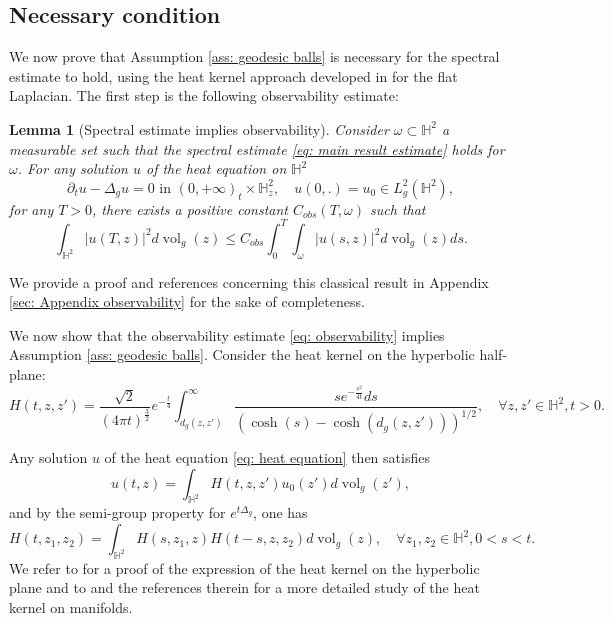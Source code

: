 \documentclass[letterpaper,11pt]{amsart}
\theoremstyle{note}
\newtheorem{lemma}[proposition]{Lemma}
\numberwithin{equation}{section}
\DeclareMathOperator{\vol}{vol}
\begin{document}
\subsection{Necessary condition}
\label{sec: necessary condition}

We now prove that Assumption \ref{ass: geodesic balls} is necessary for the spectral estimate to hold, using the heat kernel approach developed in \cite{wangwangzhangzhang2019spectralineq_heat} for the flat Laplacian. The first step is the following observability estimate:

\begin{lemma}[Spectral estimate implies observability]
    \label{lemma: observability}
    Consider $\omega \subset \mathbb{H}^2$ a measurable set such that the spectral estimate \eqref{eq: main result estimate} holds for $\omega$. For any solution $u$ of the heat equation on $\mathbb{H}^2$ \begin{equation}
        \label{eq: heat equation}
        \partial_t u - \Delta_g u = 0 \text{ in } (0, +\infty)_t \times \mathbb{H}^2_z, \quad u(0,.) = u_0 \in L^2_g(\mathbb{H}^2),
    \end{equation} for any $T > 0$, there exists a positive constant $C_{obs}(T, \omega)$ such that \begin{equation}
        \label{eq: observability}
        \int_{\mathbb{H}^2} |u(T,z)|^2 d\vol_g(z) \leq C_{obs} \int_0^T \int_\omega |u(s,z)|^2 d\vol_g(z)ds.
    \end{equation}
\end{lemma} We provide a proof and references concerning this classical result in Appendix \ref{sec: Appendix observability} for the sake of completeness.

We now show that the observability estimate \eqref{eq: observability} implies Assumption \ref{ass: geodesic balls}. Consider the heat kernel on the hyperbolic half-plane: \begin{equation}
    \label{eq: heat kernel expression}
    H(t, z, z') = \frac{\sqrt{2}}{(4\pi t)^\frac{3}{2}} e^{-\frac{t}{4}} \int_{d_g(z,z')}^\infty \frac{s e^{-\frac{s^2}{4t}}ds}{\left(\cosh(s) - \cosh(d_g(z,z'))\right)^{1/2}}, \quad \forall z, z' \in \mathbb{H}^2, t > 0.
\end{equation}

Any solution $u$ of the heat equation \eqref{eq: heat equation} then satisfies \begin{equation}
    \label{eq: general heat solution via heat kernel}
    u(t,z) = \int_{\mathbb{H}^2} H(t,z,z') u_0(z') d\vol_g(z'),
\end{equation} and by the semi-group property for $e^{t\Delta_g}$, one has \begin{equation} \label{eq: convolution heat kernels} H(t, z_1, z_2) = \int_{\mathbb{H}^2} H(s, z_1, z) H(t-s, z, z_2) d\vol_g(z), \quad \forall z_1, z_2 \in \mathbb{H}^2, 0 < s < t.\end{equation} We refer to \cite{mckean1970spectrumnegativecurvature,grigor'yannoguchi1998heatkerhyperbolic} for a proof of the expression of the heat kernel on the hyperbolic plane and to \cite[Chapters 4, 7]{chengliyau2019estimate_heatkernel_mfd,grigor'yan2009book} and the references therein for a more detailed study of the heat kernel on manifolds.
\end{document}
